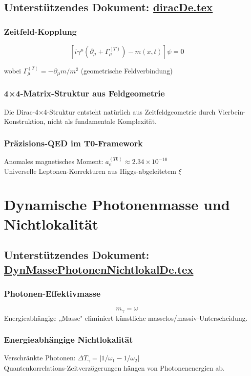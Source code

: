 \documentclass[12pt,a4paper]{report}
\begin{document}
	\subsection{Unterstützendes Dokument: \href{https://github.com/jpascher/T0-Time-Mass-Duality/tree/main/2/pdf/diracDe.pdf}{diracDe.tex}}
	
	\subsubsection{Zeitfeld-Kopplung}
	$$[i\gamma^\mu(\partial_\mu + \Gamma_\mu^{(T)}) - m(x,t)]\psi = 0$$
	
	wobei $\Gamma_\mu^{(T)} = -\partial_\mu m/m^2$ (geometrische Feldverbindung)
	
	\subsubsection{4×4-Matrix-Struktur aus Feldgeometrie}
	Die Dirac-4×4-Struktur entsteht natürlich aus Zeitfeldgeometrie durch Vierbein-Konstruktion, nicht als fundamentale Komplexität.
	
	\subsubsection{Präzisions-QED im T0-Framework}
	Anomales magnetisches Moment: $a_e^{(T0)} \approx 2.34 \times 10^{-10}$\\
	Universelle Leptonen-Korrekturen aus Higgs-abgeleitetem $\xi$
	
	\section{Dynamische Photonenmasse und Nichtlokalität}
	\subsection{Unterstützendes Dokument: \href{https://github.com/jpascher/T0-Time-Mass-Duality/tree/main/2/pdf/DynMassePhotonenNichtlokalDe.pdf}{DynMassePhotonenNichtlokalDe.tex}}
	
	\subsubsection{Photonen-Effektivmasse}
	$$m_\gamma = \omega$$
	Energieabhängige „Masse" eliminiert künstliche masselos/massiv-Unterscheidung.
	
	\subsubsection{Energieabhängige Nichtlokalität}
	Verschränkte Photonen: $\Delta T_\gamma = |1/\omega_1 - 1/\omega_2|$\\
	Quantenkorrelations-Zeitverzögerungen hängen von Photonenenergien ab.
	
\end{document}
